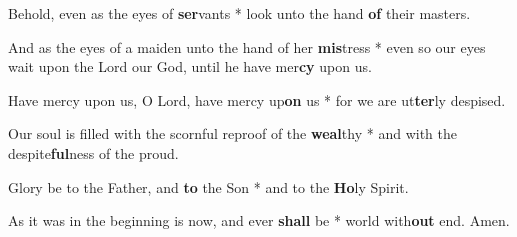 \begin{multicols}{2}
	Behold, even as the eyes of \textbf{ser}vants * look unto the hand \textbf{of} their masters.
	
	And as the eyes of a maiden unto the hand of her \textbf{mis}tress * even so our eyes wait upon the Lord our God, until he have mer\textbf{cy} upon us.
	
	Have mercy upon us, O Lord, have mercy up\textbf{on} us * for we are ut\textbf{ter}ly despised.
	
	Our soul is filled with the scornful reproof of the \textbf{weal}thy * and with the despite\textbf{ful}ness of the proud.
	
	Glory be to the Father, and \textbf{to} the Son * and to the \textbf{Ho}ly Spirit.
	
	As it was in the beginning is now, and ever \textbf{shall} be * world with\textbf{out} end. Amen.
\end{multicols}